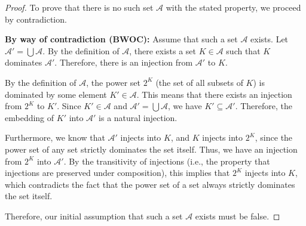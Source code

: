 \begin{proof}
    To prove that there is no such set \(\mathcal{A}\) with the stated property, we proceed by contradiction.

    \textbf{By way of contradiction (BWOC):} Assume that such a set \(\mathcal{A}\) exists. Let \(\mathcal{A}' = \bigcup \mathcal{A}\). By the definition of \(\mathcal{A}\), there exists a set \(K \in \mathcal{A}\) such that \(K\) dominates \(\mathcal{A}'\). Therefore, there is an injection from \(\mathcal{A}'\) to \(K\).

    By the definition of \(\mathcal{A}\), the power set \(2^K\) (the set of all subsets of \(K\)) is dominated by some element \(K' \in \mathcal{A}\). This means that there exists an injection from \(2^K\) to \(K'\). Since \(K' \in \mathcal{A}\) and \(\mathcal{A}' = \bigcup \mathcal{A}\), we have \(K' \subseteq \mathcal{A}'\). Therefore, the embedding of \(K'\) into \(\mathcal{A}'\) is a natural injection.

    Furthermore, we know that \(\mathcal{A}'\) injects into \(K\), and \(K\) injects into \(2^K\), since the power set of any set strictly dominates the set itself. Thus, we have an injection from \(2^K\) into \(\mathcal{A}'\). By the transitivity of injections (i.e., the property that injections are preserved under composition), this implies that \(2^K\) injects into \(K\), which contradicts the fact that the power set of a set always strictly dominates the set itself.

    Therefore, our initial assumption that such a set \(\mathcal{A}\) exists must be false.
\end{proof}

